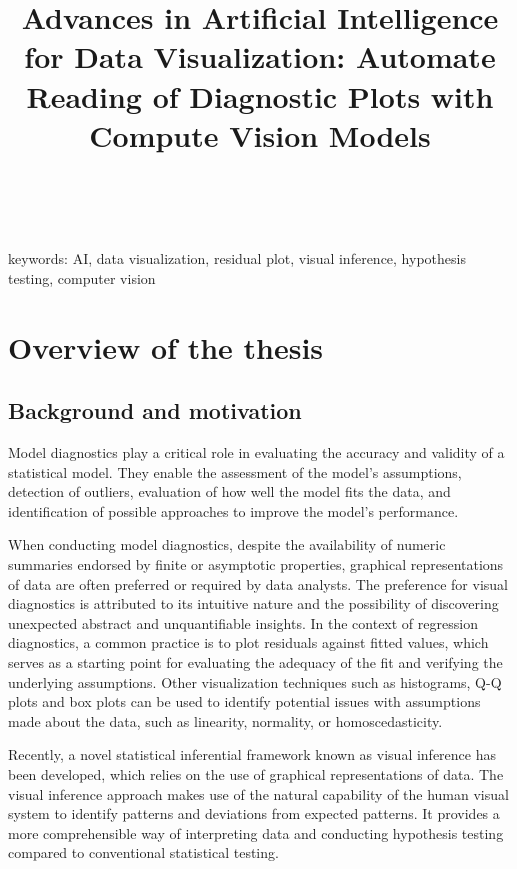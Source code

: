 \documentclass[11pt,a4paper,]{article}
\title{Advances in Artificial Intelligence for Data Visualization: Automate Reading of Diagnostic Plots with Compute Vision Models}
\author{\sf{\Large\textbf{Weihao (Patrick) Li}\\\large PhD student\\[0.5cm]}}
\date{\sf\Date~\Month~\Year}
\makeatletter
\def\titlepage{\front{\expandafter{\@title}}{\@author}{\@organization}}
\makeatother
\begin{document}
\titlepage

keywords:
AI, data visualization, residual plot, visual inference, hypothesis testing, computer vision

\hypertarget{overview-of-the-thesis}{%
\section{Overview of the thesis}\label{overview-of-the-thesis}}

\hypertarget{background-and-motivation}{%
\subsection{Background and motivation}\label{background-and-motivation}}

Model diagnostics play a critical role in evaluating the accuracy and validity of a statistical model. They enable the assessment of the model's assumptions, detection of outliers, evaluation of how well the model fits the data, and identification of possible approaches to improve the model's performance.

When conducting model diagnostics, despite the availability of numeric summaries endorsed by finite or asymptotic properties, graphical representations of data are often preferred or required by data analysts. The preference for visual diagnostics is attributed to its intuitive nature and the possibility of discovering unexpected abstract and unquantifiable insights. In the context of regression diagnostics, a common practice is to plot residuals against fitted values, which serves as a starting point for evaluating the adequacy of the fit and verifying the underlying assumptions. Other visualization techniques such as histograms, Q-Q plots and box plots can be used to identify potential issues with assumptions made about the data, such as linearity, normality, or homoscedasticity.

Recently, a novel statistical inferential framework known as visual inference \autocite{buja_statistical_2009} has been developed, which relies on the use of graphical representations of data. The visual inference approach makes use of the natural capability of the human visual system to identify patterns and deviations from expected patterns. It provides a more comprehensible way of interpreting data and conducting hypothesis testing compared to conventional statistical testing.
\end{document}
